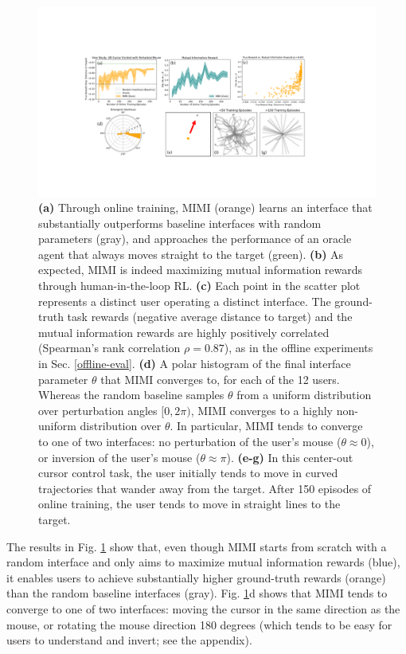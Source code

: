 \documentclass{article}
\begin{document}
\begin{figure}[t]
    \centering
    \includegraphics[width=\linewidth]{cursor-online.pdf}
    \caption{\textbf{(a)} Through online training, MIMI (orange) learns an interface that substantially outperforms baseline interfaces with random parameters (gray), and approaches the performance of an oracle agent that always moves straight to the target (green). \textbf{(b)} As expected, MIMI is indeed maximizing mutual information rewards through human-in-the-loop RL. \textbf{(c)} Each point in the scatter plot represents a distinct user operating a distinct interface. The ground-truth task rewards (negative average distance to target) and the mutual information rewards are highly positively correlated (Spearman's rank correlation $\rho = 0.87$), as in the offline experiments in Sec. \ref{offline-eval}. \textbf{(d)} A polar histogram of the final interface parameter $\theta$ that MIMI converges to, for each of the 12 users. Whereas the random baseline samples $\theta$ from a uniform distribution over perturbation angles $[0, 2\pi)$, MIMI converges to a highly non-uniform distribution over $\theta$. In particular, MIMI tends to converge to one of two interfaces: no perturbation of the user's mouse ($\theta \approx 0$), or inversion of the user's mouse ($\theta \approx \pi$). \textbf{(e-g)} In this center-out cursor control task, the user initially tends to move in curved trajectories that wander away from the target. After 150 episodes of online training, the user tends to move in straight lines to the target.}
    \label{fig:online-cursor}
\end{figure}

The results in Fig. \ref{fig:online-cursor} show that, even though MIMI starts from scratch with a random interface and only aims to maximize mutual information rewards (blue), it enables users to achieve substantially higher ground-truth rewards (orange) than the random baseline interfaces (gray).
Fig. \ref{fig:online-cursor}d shows that MIMI tends to converge to one of two interfaces: moving the cursor in the same direction as the mouse, or rotating the mouse direction 180 degrees (which tends to be easy for users to understand and invert; see the appendix).
\end{document}
